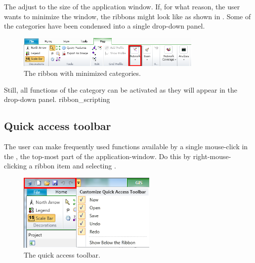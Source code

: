 %
\Note The  adjust to the size of the application window. If, for what reason, the user wants to minimize the window, the ribbons might look like as shown in . Some of the  categories have been condensed into a single drop-down panel.
\begin{figure}[H]
	\centering
	\includegraphics[width=0.8\textwidth]{Figures/Chapter_overview/ribbon_map_minimised.png}
	\caption{The ribbon with minimized categories.}
	\label{fig:ribbonmapminimised}		
\end{figure}
%
Still, all functions of the category can be activated as they will appear in the drop-down panel.
%
{ribbon_scripting}
%
\subsection{Quick access toolbar}
\label{ssec:Qaccestoolbar}
\Note The user can make frequently used functions available by a single mouse-click in the , the top-most part of the application-window. Do this by right-mouse-clicking a ribbon item and selecting .
%
\begin{figure}[H]
	\centering
	\includegraphics[width=0.6\textwidth]{Figures/Chapter_overview/quick_access_toolbar.png}
	\caption{The quick access toolbar.}
	\label{fig:qat}		
\end{figure}